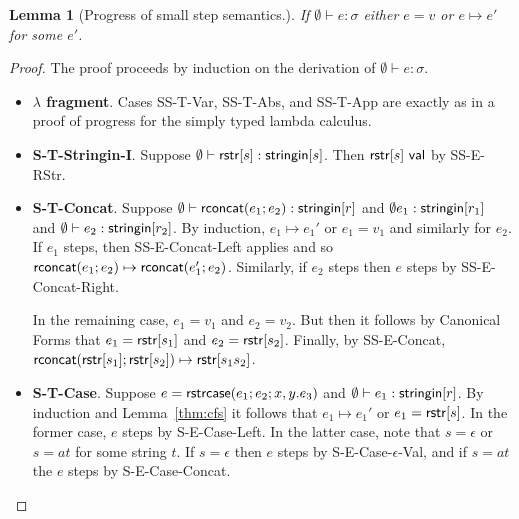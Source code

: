 \documentclass[11pt,leqno]{article}
\newtheorem{trlem}[tr]{Lemma}
\theoremstyle{definition}
\newcommand{\val}{{\sf val}}
\newcommand{\stringin}[1]{{\sf stringin}[#1]}
\newcommand{\strcase}[3]{ {\sf rstrcase}(#1; #2; #3)}
\newcommand{\lhead}[1]{ {\sf lhead}(#1) }
\newcommand{\ltail}[1]{ {\sf ltail}(#1) }
\begin{document}
\begin{trlem}[Progress of small step semantics.]
If $\emptyset\vdash e : \sigma$ either $e = v$ or $e \mapsto e'$ for some $e'$.
\end{trlem}
\begin{proof}
The proof proceeds by induction on the derivation of $\emptyset\vdash e : \sigma$.
\begin{itemize}[label=$ $,itemsep=1ex]
\item \textbf{$\lambda$ fragment}. Cases SS-T-Var, SS-T-Abs, and SS-T-App are exactly as in a proof of progress for
the simply typed lambda calculus.

\item \textbf{S-T-Stringin-I}. Suppose $\emptyset\vdash \rstr{s} : \stringin{s}$.
Then $\rstr{s} \ \val$ by SS-E-RStr.

\item \textbf{S-T-Concat}. Suppose $\emptyset\vdash \rconcat{e_1}{e_2} : \stringin{r}$ and $\emptyset e_1 : \stringin{r_1}$ and $\emptyset \vdash e_2 : \stringin{r_2}$.
By induction, $e_1 \mapsto e_1'$ or $e_1 = v_1$ and similarly
for $e_2$. 
If $e_1$ steps, then SS-E-Concat-Left applies and so
${\sf rconcat}(e_1;e_2) \mapsto {\sf rconcat}(e_1';e_2)$. Similarly, if $e_2$ steps
then $e$ steps by SS-E-Concat-Right.

In the remaining case, $e_1 =v_1$ and $e_2 =v_2$.
But then it follows by Canonical Forms that $e_1 = {\sf rstr}[s_1]$
and $e_2 = {\sf rstr}[s_2]$.
Finally, by SS-E-Concat, ${\sf rconcat}({\sf rstr}[s_1];{\sf rstr}[s_2]) \mapsto {\sf rstr}[s_1s_2]$.

\def\mline#1{\par\hspace*{-\leftmargin}\parbox{\textwidth}{\[#1\]}}
\item \textbf{S-T-Case}.
Suppose $e = \strcase{e_1}{e_2}{x,y.e_3}$ and $\emptyset\vdash e_1 : \stringin{r}$.
By induction and Lemma~\ref{thm:cfs} it follows that $e_1 \mapsto e_1'$ or $e_1 = {\sf rstr}[s]$.
In the former case, $e$ steps by S-E-Case-Left.
In the latter case, note that $s = \epsilon$ or $s = at$ for some string $t$.
If $s = \epsilon$ then $e$ steps by S-E-Case-$\epsilon$-Val,
and if $s = at$ the $e$ steps by S-E-Case-Concat.


\end{itemize}
\end{proof}
\end{document}
